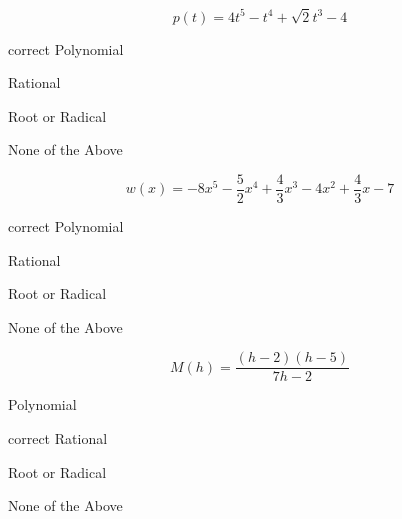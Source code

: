 \documentclass{ximera}
\begin{document}
\begin{exercise}
\begin{question}


\[
p(t) = 4t^5 - t^4 + \sqrt{2} t^3 - 4
\]

\begin{multipleChoice}
\item [correct]{Polynomial}
\item {Rational}
\item {Root or Radical}
\item {None of the Above}
\end{multipleChoice}


\end{question}












\begin{question}


\[
w(x) = -8x^5 - \frac{5}{2} x^4 + \frac{4}{3} x^3 - 4x^2 + \frac{4}{3} x - 7
\]

\begin{multipleChoice}
\item [correct]{Polynomial}
\item {Rational}
\item {Root or Radical}
\item {None of the Above}
\end{multipleChoice}


\end{question}











\begin{question}


\[
M(h) = \frac{(h-2)(h-5)}{7h - 2}
\]

\begin{multipleChoice}
\item {Polynomial}
\item [correct]{Rational}
\item {Root or Radical}
\item {None of the Above}
\end{multipleChoice}


\end{question}











\end{exercise}
\end{document}
